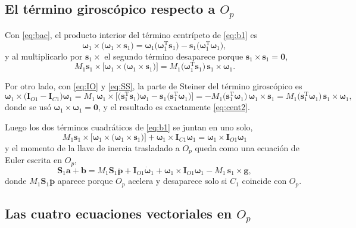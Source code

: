 \documentclass[11pt]{article}
\newcommand{\T}{^{\mathrm{T}}}
\newcommand{\pvec}{\mathbf{p}}
\newcommand{\wv}{\boldsymbol{\omega}}
\newcommand{\IO}[1]{\mathbf{I}_{O#1}}
\newcommand{\IC}[1]{\mathbf{I}_{C#1}}
\begin{document}
\subsection{El término giroscópico respecto a $O_p$}

Con \eqref{eq:bac}, el producto interior del término centrípeto de \eqref{eq:b1} es
\begin{equation}
\wv_1\times\big(\wv_1\times\mathbf{s}_1\big)
=\wv_1\big(\wv_1\T\mathbf{s}_1\big)-\mathbf{s}_1\big(\wv_1\T\wv_1\big),
\label{eq:cent1}
\end{equation}
y al multiplicarlo por $\mathbf{s}_1\times$ el segundo término desaparece porque $\mathbf{s}_1\times\mathbf{s}_1=\mathbf{0}$,
\begin{equation}
M_1\mathbf{s}_1\times\Big[\wv_1\times\big(\wv_1\times\mathbf{s}_1\big)\Big]
=M_1\big(\wv_1\T\mathbf{s}_1\big)\,\mathbf{s}_1\times\wv_1 .
\label{eq:cent2}
\end{equation}

Por otro lado, con \eqref{eq:IO} y \eqref{eq:SS}, la parte de Steiner del término giroscópico es
\begin{equation}
\wv_1\times\big(\IO{1}-\IC{1}\big)\wv_1
=M_1\,\wv_1\times\Big[\big(\mathbf{s}_1\T\mathbf{s}_1\big)\wv_1-\mathbf{s}_1\big(\mathbf{s}_1\T\wv_1\big)\Big]
=-M_1\big(\mathbf{s}_1\T\wv_1\big)\,\wv_1\times\mathbf{s}_1
=M_1\big(\mathbf{s}_1\T\wv_1\big)\,\mathbf{s}_1\times\wv_1 ,
\label{eq:gir}
\end{equation}
donde se usó $\wv_1\times\wv_1=\mathbf{0}$, y el resultado es exactamente \eqref{eq:cent2}.

Luego los dos términos cuadráticos de \eqref{eq:b1} se juntan en uno solo,
\begin{equation}
\boxed{\ M_1\mathbf{s}_1\times\Big[\wv_1\times\big(\wv_1\times\mathbf{s}_1\big)\Big]+\wv_1\times\IC{1}\wv_1
=\wv_1\times\IO{1}\wv_1\ }
\label{eq:girO}
\end{equation}
y el momento de la llave de inercia trasladado a $O_p$ queda como una ecuación de Euler escrita en $O_p$,
\begin{equation}
\mathbf{S}_1\mathbf{a}+\mathbf{b}
=M_1\mathbf{S}_1\ddot{\pvec}+\IO{1}\dot{\wv}_1+\wv_1\times\IO{1}\wv_1-M_1\,\mathbf{s}_1\times\mathbf{g} ,
\label{eq:b1bis}
\end{equation}
donde $M_1\mathbf{S}_1\ddot{\pvec}$ aparece porque $O_p$ acelera y desaparece solo si $C_1$ coincide con $O_p$.

\subsection{Las cuatro ecuaciones vectoriales en $O_p$}
\end{document}
